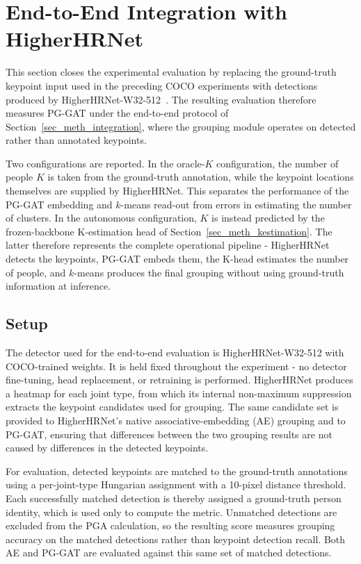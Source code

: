 \section{End-to-End Integration with HigherHRNet}
\label{sec_res_e2e}

This section closes the experimental evaluation by replacing the
ground-truth keypoint input used in the preceding COCO experiments with
detections produced by HigherHRNet-W32-512~\cite{cheng2020higherhrnet}.
The resulting evaluation therefore measures PG-GAT under the
end-to-end protocol of Section~\ref{sec_meth_integration},
where the grouping module operates on detected rather than annotated
keypoints.

Two configurations are reported.
In the oracle-$K$ configuration,
the number of people $K$ is taken from the ground-truth annotation,
while the keypoint locations themselves are supplied by HigherHRNet.
This separates the performance of the PG-GAT embedding and $k$-means
read-out from errors in estimating the number of clusters.
In the autonomous configuration,
$K$ is instead predicted by the frozen-backbone K-estimation head
of Section~\ref{sec_meth_kestimation}.
The latter therefore represents the complete operational pipeline -
HigherHRNet detects the keypoints,
PG-GAT embeds them,
the K-head estimates the number of people,
and $k$-means produces the final grouping without using ground-truth
information at inference.

\subsection{Setup}
\label{sec_res_e2e_setup}

The detector used for the end-to-end evaluation is
HigherHRNet-W32-512 with COCO-trained weights.
It is held fixed throughout the experiment -
no detector fine-tuning,
head replacement,
or retraining is performed.
HigherHRNet produces a heatmap for each joint type,
from which its internal non-maximum suppression extracts the keypoint
candidates used for grouping.
The same candidate set is provided to HigherHRNet's native
associative-embedding (AE) grouping and to PG-GAT,
ensuring that differences between the two grouping results are not
caused by differences in the detected keypoints.

For evaluation,
detected keypoints are matched to the ground-truth annotations
using a per-joint-type Hungarian assignment with a 10-pixel distance
threshold.
Each successfully matched detection is thereby assigned a ground-truth
person identity,
which is used only to compute the metric.
Unmatched detections are excluded from the PGA calculation,
so the resulting score measures grouping accuracy on the matched
detections rather than keypoint detection recall.
Both AE and PG-GAT are evaluated against this same set of matched
detections.

